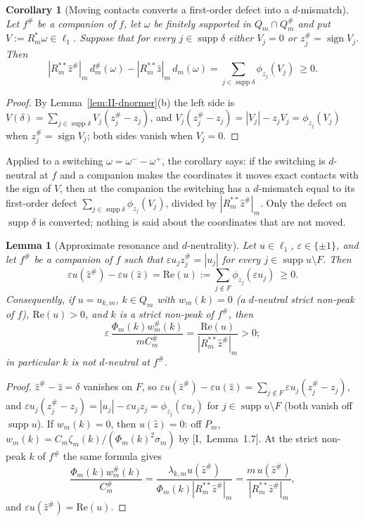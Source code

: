 \documentclass[10pt]{amsart}
\newtheorem{lemma}[theorem]{Lemma}
\newtheorem{corollary}[theorem]{Corollary}
\theoremstyle{definition}
\theoremstyle{remark}
\newcommand{\supp}{\operatorname{supp}}
\newcommand{\sgn}{\operatorname{sign}}
\newcommand{\zh}{\hat z}
\begin{document}
\begin{corollary}[Moving contacts converts a first-order defect into a $d$-mismatch]\label{cor:II-defect}
Let $f^\#$ be a companion of $f$, let $\omega$ be finitely supported in
$Q_m\cap Q^\#_m$ and put $V:=R_m^*\omega\in\ell_1$.  Suppose that for every
$j\in\supp\delta$ either $V_j=0$ or $z^\#_j=\sgn V_j$.  Then
\[
 |R_m^{**}\zh^\#|_m\,d^\#_m(\omega)-|R_m^{**}\zh|_m\,d_m(\omega)
 =\sum_{j\in\supp\delta}\phi_{z_j}(V_j)\ \ge0 .
\]
\end{corollary}

\begin{proof}
By Lemma~\ref{lem:II-dnormer}(b) the left side is $V(\delta)=\sum_{j\in
\supp\delta}V_j(z^\#_j-z_j)$, and $V_j(z^\#_j-z_j)=|V_j|-z_jV_j=
\phi_{z_j}(V_j)$ when $z^\#_j=\sgn V_j$; both sides vanish when $V_j=0$.
\end{proof}

Applied to a switching $\omega=\omega^--\omega^+$, the corollary says: if
the switching is $d$-neutral at $f$ and a companion makes the coordinates
it moves exact contacts with the sign of $V$, then at the companion the
switching has a $d$-mismatch equal to its first-order defect
$\sum_{j\in\supp\delta}\phi_{z_j}(V_j)$, divided by $|R_m^{**}\zh^\#|_m$.
Only the defect on $\supp\delta$ is converted; nothing is said about
the coordinates that are not moved.

\begin{lemma}[Approximate resonance and $d$-neutrality]\label{lem:II-resonance}
Let $u\in\ell_1$, $\varepsilon\in\{\pm1\}$, and let $f^\#$ be a companion
of $f$ such that $\varepsilon u_jz^\#_j=|u_j|$ for every $j\in\supp
u\setminus F$.  Then
\[
 \varepsilon u(\zh^\#)-\varepsilon u(\zh)=\mathrm{Re}(u):=\sum_{j\notin F}
 \phi_{z_j}(\varepsilon u_j)\ \ge0 .
\]
Consequently, if $u=u_{k,m}$, $k\in Q_m$ with $w_m(k)=0$ \textup{(}a
$d$-neutral strict non-peak of $f$\textup{)}, $\mathrm{Re}(u)>0$, and $k$ is
a strict non-peak of $f^\#$, then
\[
 \varepsilon\,\frac{\Phi_m(k)w^\#_m(k)}{mC^\#_m}=
 \frac{\mathrm{Re}(u)}{|R_m^{**}\zh^\#|_m}>0 ;
\]
in particular $k$ is not $d$-neutral at $f^\#$.
\end{lemma}

\begin{proof}
$\zh^\#-\zh=\delta$ vanishes on $F$, so $\varepsilon u(\zh^\#)-\varepsilon
u(\zh)=\sum_{j\notin F}\varepsilon u_j(z^\#_j-z_j)$, and
$\varepsilon u_j(z^\#_j-z_j)=|u_j|-\varepsilon u_jz_j=\phi_{z_j}(\varepsilon
u_j)$ for $j\in\supp u\setminus F$ (both vanish off $\supp u$).  If
$w_m(k)=0$, then $u(\zh)=0$: off $P_m$, $w_m(k)=C_m\zeta_m(k)/(\Phi_m(k)^2
\sigma_m)$ by [I,~Lemma~1.7].  At the strict non-peak $k$ of $f^\#$ the same
formula gives
\[
 \frac{\Phi_m(k)w^\#_m(k)}{C^\#_m}=\frac{\lambda_{k,m}u(\zh^\#)}{\Phi_m(k)
 |R_m^{**}\zh^\#|_m}=\frac{m\,u(\zh^\#)}{|R_m^{**}\zh^\#|_m},
\]
and $\varepsilon u(\zh^\#)=\mathrm{Re}(u)$.
\end{proof}
\end{document}
